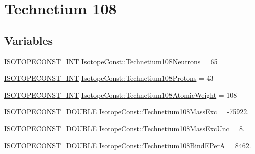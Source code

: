 \hypertarget{group___isotope_const-_technetium-_tc108}{}\section{Technetium 108}
\label{group___isotope_const-_technetium-_tc108}
\subsection*{Variables}
\begin{DoxyCompactItemize}
\item 
\mbox{\hyperlink{group___isotope_const-_macros_ga5f18360b3e99483a35c32d789e62621c}{I\+S\+O\+T\+O\+P\+E\+C\+O\+N\+S\+T\+\_\+\+I\+NT}} \mbox{\hyperlink{group___isotope_const-_technetium-_tc108_ga97ecae767091d6bda25f43b24c4596dc}{Isotope\+Const\+::\+Technetium108\+Neutrons}} = 65
\item 
\mbox{\hyperlink{group___isotope_const-_macros_ga5f18360b3e99483a35c32d789e62621c}{I\+S\+O\+T\+O\+P\+E\+C\+O\+N\+S\+T\+\_\+\+I\+NT}} \mbox{\hyperlink{group___isotope_const-_technetium-_tc108_ga34191ea8832dfea0f58f8a1844e327b4}{Isotope\+Const\+::\+Technetium108\+Protons}} = 43
\item 
\mbox{\hyperlink{group___isotope_const-_macros_ga5f18360b3e99483a35c32d789e62621c}{I\+S\+O\+T\+O\+P\+E\+C\+O\+N\+S\+T\+\_\+\+I\+NT}} \mbox{\hyperlink{group___isotope_const-_technetium-_tc108_gada872d09f61877f608634ae15f26a0f4}{Isotope\+Const\+::\+Technetium108\+Atomic\+Weight}} = 108
\item 
\mbox{\hyperlink{group___isotope_const-_macros_ga8f45a7272ce02c0b4c65c44636ed719a}{I\+S\+O\+T\+O\+P\+E\+C\+O\+N\+S\+T\+\_\+\+D\+O\+U\+B\+LE}} \mbox{\hyperlink{group___isotope_const-_technetium-_tc108_gae8c158e1d256861e052cad27cd24cd98}{Isotope\+Const\+::\+Technetium108\+Mass\+Exc}} = -\/75922.
\item 
\mbox{\hyperlink{group___isotope_const-_macros_ga8f45a7272ce02c0b4c65c44636ed719a}{I\+S\+O\+T\+O\+P\+E\+C\+O\+N\+S\+T\+\_\+\+D\+O\+U\+B\+LE}} \mbox{\hyperlink{group___isotope_const-_technetium-_tc108_gaedebbea53b7a313f069d5c4d52e55e3d}{Isotope\+Const\+::\+Technetium108\+Mass\+Exc\+Unc}} = 8.
\item 
\mbox{\hyperlink{group___isotope_const-_macros_ga8f45a7272ce02c0b4c65c44636ed719a}{I\+S\+O\+T\+O\+P\+E\+C\+O\+N\+S\+T\+\_\+\+D\+O\+U\+B\+LE}} \mbox{\hyperlink{group___isotope_const-_technetium-_tc108_gacbf363fb3d0fd15dfcf3600ff945b563}{Isotope\+Const\+::\+Technetium108\+Bind\+E\+PerA}} = 8462.

\end{DoxyCompactItemize}
